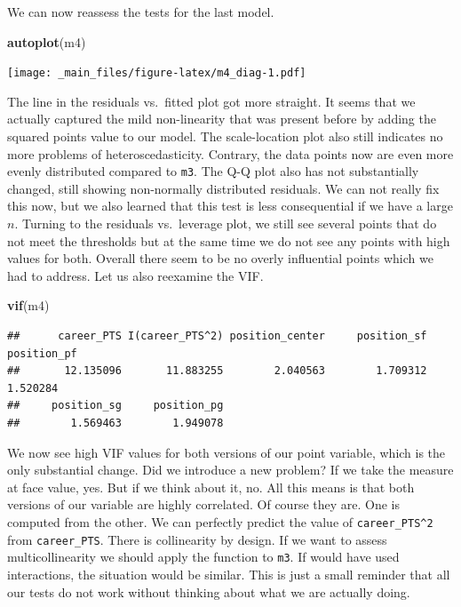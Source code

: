 \documentclass[
]{book}
\newenvironment{Shaded}{\begin{snugshade}}{\end{snugshade}}
\newcommand{\FunctionTok}[1]{\textcolor[rgb]{0.13,0.29,0.53}{\textbf{#1}}}
\newcommand{\NormalTok}[1]{#1}
\begin{document}
We can now reassess the tests for the last model.

\begin{Shaded}
\begin{Highlighting}[]
\FunctionTok{autoplot}\NormalTok{(m4)}
\end{Highlighting}
\end{Shaded}

\texttt{[image: \_main\_files/figure-latex/m4\_diag-1.pdf]}

The line in the residuals vs.~fitted plot got more straight. It seems that we
actually captured the mild non-linearity that was present before by adding the
squared points value to our model. The scale-location plot also still indicates
no more problems of heteroscedasticity. Contrary, the data points now are even
more evenly distributed compared to \texttt{m3}. The Q-Q plot also has not substantially changed,
still showing non-normally distributed residuals. We can not really fix this
now, but we also learned that this test is less consequential if we have a
large \(n\). Turning to the residuals vs.~leverage plot, we still see several points
that do not meet the thresholds but at the same time we do not see any points
with high values for both. Overall there seem to be no overly influential points
which we had to address. Let us also reexamine the VIF.

\begin{Shaded}
\begin{Highlighting}[]
\FunctionTok{vif}\NormalTok{(m4)}
\end{Highlighting}
\end{Shaded}

\begin{verbatim}
##      career_PTS I(career_PTS^2) position_center     position_sf     position_pf 
##       12.135096       11.883255        2.040563        1.709312        1.520284 
##     position_sg     position_pg 
##        1.569463        1.949078
\end{verbatim}

We now see high VIF values for both versions of our point variable, which is the
only substantial change. Did we introduce a
new problem? If we take the measure at face value, yes. But if we think about
it, no. All this means is that both versions of our variable are highly
correlated. Of course they are. One is computed from the other. We can
perfectly predict the value of \texttt{career\_PTS\^{}2} from \texttt{career\_PTS}. There is
collinearity by design. If we want to assess multicollinearity we should apply
the function to \texttt{m3}. If would have used interactions, the situation would be
similar. This is just a small reminder that all our tests do not work without
thinking about what we are actually doing.
\end{document}
